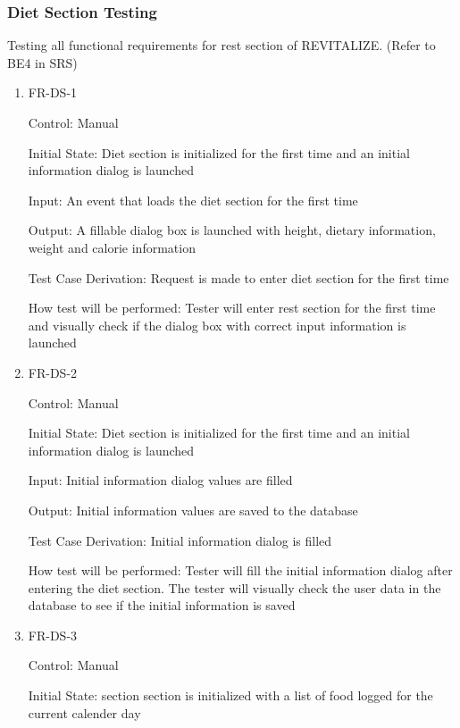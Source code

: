 \documentclass[12pt, titlepage]{article}
\begin{document}
\subsubsection{Diet Section Testing}

Testing all functional requirements for rest section of REVITALIZE. (Refer to BE4 in SRS)

\begin{enumerate}
	
	\item{FR-DS-1\\}
	
	Control: Manual
	
	Initial State: Diet section is initialized for the first time and an initial information dialog is launched
	
	Input: An event that loads the diet section for the first time
	
	Output: A fillable dialog box is launched with height, dietary information, weight and calorie information
	
	Test Case Derivation: Request is made to enter diet section for the first time
	
	How test will be performed: Tester will enter rest section for the first time and visually check if the dialog box with correct input information is launched
	
	\item{FR-DS-2\\}
	
	Control: Manual
	
	Initial State: Diet section is initialized for the first time and an initial information dialog is launched
	
	Input: Initial information dialog values are filled
	
	Output: Initial information values are saved to the database
	
	Test Case Derivation: Initial information dialog is filled
	
	How test will be performed: Tester will fill the initial information dialog after entering the diet section. The tester will visually check the user data in the database to see if the initial information is saved
	
	
	\item{FR-DS-3\\}
	
	Control: Manual
	
	Initial State: section section is initialized with a list of food logged for the current calender day
	

\end{enumerate}
\end{document}
